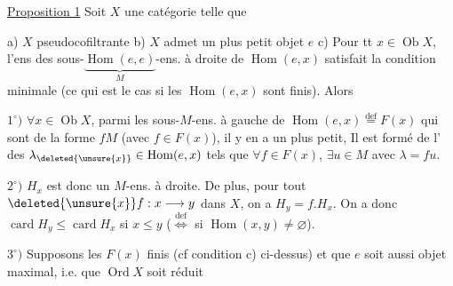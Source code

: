 
\uline{Proposition 1} Soit $X$ une catégorie telle que

 a) $X$ pseudocofiltrante \quad b) $X$ admet un plus petit objet $e$   c) Pour tt $x\in\operatorname{Ob}X$, l'ens des sous-$\underbrace{\operatorname{Hom}(e,e)}_{M}$-ens. à droite de $\operatorname{Hom}(e,x)$ satisfait la condition minimale (ce qui est le cas si les $\operatorname{Hom}(e,x)$ sont finis). Alors

$1^\circ)$ $\forall x\in\operatorname{Ob}X$, parmi les sous-$M$-ens. à gauche de $\operatorname{Hom}(e,x)\overset{\mathrm{def}}=F(x)$ qui sont de la forme $fM$ (avec $f\in F(x)$), il y en a un plus petit,  Il est formé de l' des $\lambda_{\deleted{\unsure{x}}}\in\operatorname{Hom}(e,x)$   tels que  $\forall f\in F(x)$, $\exists u\in M$ avec $\lambda=fu$.

$2^\circ)$ $H_x$ est donc un $M$-ens. à droite. De plus, pour tout $\deleted{\unsure{x}}f:x\longrightarrow y$ dans $X$, on a $H_y=f.H_x$. On a donc $\operatorname{card} H_y\leq\operatorname{card} H_x$ si $x\leq y$ ($\overset{\mathrm{def}}\Longleftrightarrow$ si $\operatorname{Hom}(x,y)\ne\varnothing$).

$3^\circ)$ Supposons les $F(x)$ finis (cf condition c) ci-dessus) et que $e$ soit aussi objet maximal, i.e. que $\operatorname{Ord} X$ soit réduit
